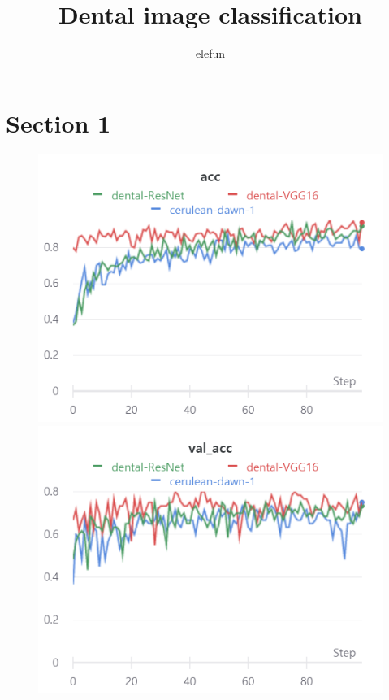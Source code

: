 \documentclass{article}
\title{Dental image classification}
\author{%
elefun
}
\begin{document}
\maketitle

\section{Section 1}

\begin{figure}[!htb]
\includegraphics[width=\linewidth]{charts/Section-1-Panel-0-ga735wfu0}
\caption{}
\endminipage\hfill
{}
\includegraphics[width=\linewidth]{charts/Section-1-Panel-1-s0lbeggtt}
\caption{}
\endminipage
\end{figure}
\end{document}
